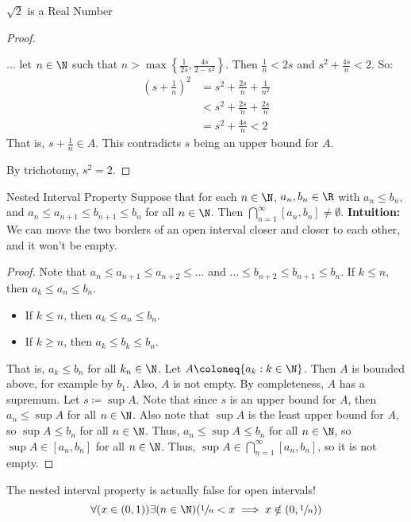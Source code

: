\begin{thmbox}{$\sqrt{2}$ is a Real Number}{}
\begin{proof}
\begin{enumerate}
\begin{notebox}
            \end{notebox}
            $\ldots$ let $n \in \N$ such that $n > \max\left\{ \frac{1}{2s}, \frac{4s}{2-s^2} \right\}$. Then $\frac{1}{n} < 2s$ and $s^2 + \frac{4s}{n} < 2$. So:
            \begin{align*}
                \left( s + \frac{1}{n} \right)^2
                &= s^2 + \frac{2s}{n} + \frac{1}{n^2} \\
                &< s^2 + \frac{2s}{n} + \frac{2s}{n} \\
                &= s^2 + \frac{4s}{n} < 2
            \end{align*}
            That is, $s + \frac{1}{n} \in A$. This contradicts $s$ being an upper bound for $A$.
        \end{enumerate}
        By trichotomy, $s^2 = 2$.
    \end{proof}
\end{thmbox}

\begin{thmbox}{Nested Interval Property}{}
    Suppose that for each $n \in \N$, $a_n, b_n \in \R$ with $a_n \leq b_n$, and $a_n \leq a_{n+1} \leq b_{n+1} \leq b_n$ for all $n \in \N$. Then $\bigcap_{n=1}^\infty [ a_n, b_n ] \neq \emptyset$.
    \tcblower
    \textbf{Intuition:} We can move the two borders of an open interval closer and closer to each other, and it won't be empty.
    \begin{proof}
        Note that $a_n \leq a_{n+1} \leq a_{n+2} \leq \ldots$ and $\ldots \leq b_{n+2} \leq b_{n+1} \leq b_n$. If $k \leq n$, then $a_k \leq a_n \leq b_n$.
        \begin{itemize}[noitemsep]
            \item If $k \leq n$, then $a_k \leq a_n \leq b_n$.
            \item If $k \geq n$, then $a_k \leq b_k \leq b_n$.
        \end{itemize}
        That is, $a_k \leq b_n$ for all $k_n \in \N$. Let $A \coloneq \{ a_k : k \in \N\}$. Then $A$ is bounded above, for example by $b_1$. Also, $A$ is not empty. By completeness, $A$ has a supremum. Let $s \coloneq \sup A$. Note that since $s$ is an upper bound for $A$, then $a_n \leq \sup A$ for all $n \in \N$. Also note that $\sup A$ is the least upper bound for $A$, so $\sup A \leq b_n$ for all $n \in \N$. Thus, $a_n \leq \sup A \leq b_n$ for all $n \in \N$, so $\sup A \in [ a_n, b_n ]$ for all $n \in \N$. Thus, $\sup A \in \bigcap_{n=1}^\infty [ a_n, b_n ]$, so it is not empty.
    \end{proof}
\end{thmbox}

The nested interval property is actually false for open intervals!
\[ \forall (x \in (0,1)) \exists (n \in \N) (\sfrac{1}{n} < x \implies x \notin (0, \sfrac{1}{n}) ) \]
